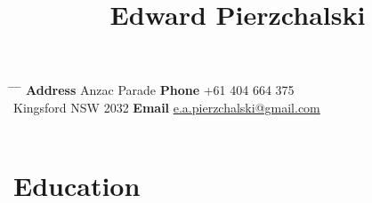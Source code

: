 \documentclass[10pt]{article} %
\begin{document}

\title{Edward Pierzchalski} %

\begin{tabbing}
 \hspace{0.2\textwidth} \= \hspace{0.3\textwidth} \= \hspace{0.2\textwidth} \= \kill
 {\bf Address}  Anzac Parade \> {\bf Phone} \> +61 404 664 375 \\
 \> Kingsford NSW 2032 \> {\bf Email} \> \href{mailto:e.a.pierzchalski@gmail.com}{e.a.pierzchalski@gmail.com} \\\\
\end{tabbing}
\vspace{-40pt}


\section{Education}
\end{document}
